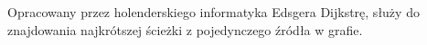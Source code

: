 \documentclass[preview]{standalone}
\begin{document}
\begin{center}
Opracowany przez holenderskiego informatyka Edsgera Dijkstrę,
 służy do znajdowania najkrótszej ścieżki z pojedynczego źródła w grafie.
\end{center}
\end{document}
